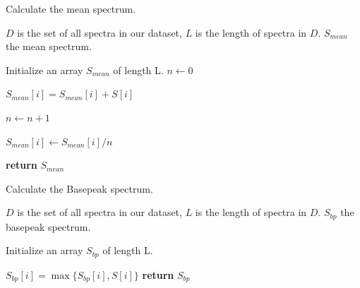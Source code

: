 \documentclass[11pt,openany]{book}
\begin{document}
    \begin{algorithm}
        \label{alg:calculate_mean_spectrum}
        \caption{Calculate the mean spectrum.}
        \begin{algorithmic}
            \Require $D$ is the set of all spectra in our dataset, $L$ is the length of spectra in $D$.
            \Ensure $S_{mean}$ the mean spectrum.
           
            
            \State Initialize an array $S_{mean}$ of length L.
            \State $n \gets 0$
            
                \State $S_{mean}[i] = S_{mean}[i] + S[i]$
                \EndFor
                
                \State $n \gets n + 1$
            \EndFor
            
                \State $S_{mean}[i] \gets S_{mean}[i] / n$
            \EndFor
            
            \State \textbf{return} $S_{mean}$
            \EndProcedure
        \end{algorithmic}
    \end{algorithm}



    \begin{algorithm}
        \label{alg:calculate_basepeak_spectrum}
        \caption{Calculate the Basepeak spectrum.}
        \begin{algorithmic}
            \Require $D$ is the set of all spectra in our dataset, $L$ is the length of spectra in $D$.
            \Ensure $S_{bp}$ the basepeak spectrum.
           
            
            \State Initialize an array $S_{bp}$ of length L.
            
                \State $S_{bp}[i] =  \max \{S_{bp}[i], S[i]\}$
                \EndFor
            \EndFor
            \State \textbf{return} $S_{bp}$
            \EndProcedure
        \end{algorithmic}
    \end{algorithm}
\end{document}
